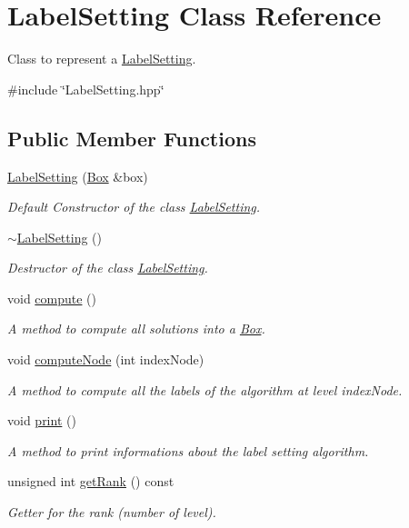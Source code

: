 \hypertarget{classLabelSetting}{\section{\-Label\-Setting \-Class \-Reference}
\label{classLabelSetting}
}


\-Class to represent a {\ttfamily \hyperlink{classLabelSetting}{\-Label\-Setting}}.  




{\ttfamily \#include \char`\"{}\-Label\-Setting.\-hpp\char`\"{}}

\subsection*{\-Public \-Member \-Functions}
\begin{DoxyCompactItemize}
\item 
\hyperlink{classLabelSetting_a4900d9e322d5d2710f8bf24becea9dfe}{\-Label\-Setting} (\hyperlink{classBox}{\-Box} \&box)
\begin{DoxyCompactList}\small\item\em \-Default \-Constructor of the class {\ttfamily \hyperlink{classLabelSetting}{\-Label\-Setting}}. \end{DoxyCompactList}\item 
\hyperlink{classLabelSetting_a202b427acdae1745bcdc4042e2185591}{$\sim$\-Label\-Setting} ()
\begin{DoxyCompactList}\small\item\em \-Destructor of the class {\ttfamily \hyperlink{classLabelSetting}{\-Label\-Setting}}. \end{DoxyCompactList}\item 
void \hyperlink{classLabelSetting_a0a9571711abe5bc871a1777f33f5a1ed}{compute} ()
\begin{DoxyCompactList}\small\item\em \-A method to compute all solutions into a {\ttfamily \hyperlink{classBox}{\-Box}}. \end{DoxyCompactList}\item 
void \hyperlink{classLabelSetting_a557fc83b4f07b721571f116684f1b247}{compute\-Node} (int index\-Node)
\begin{DoxyCompactList}\small\item\em \-A method to compute all the labels of the algorithm at level index\-Node. \end{DoxyCompactList}\item 
void \hyperlink{classLabelSetting_ade4672d8c3d57ff3bbdac1c69d20db88}{print} ()
\begin{DoxyCompactList}\small\item\em \-A method to print informations about the label setting algorithm. \end{DoxyCompactList}\item 
unsigned int \hyperlink{classLabelSetting_a98c5c2de0bd3b5fa650dbd2e47cfbff5}{get\-Rank} () const 
\begin{DoxyCompactList}\small\item\em \-Getter for the rank (number of level). \end{DoxyCompactList}\end{DoxyCompactItemize}
